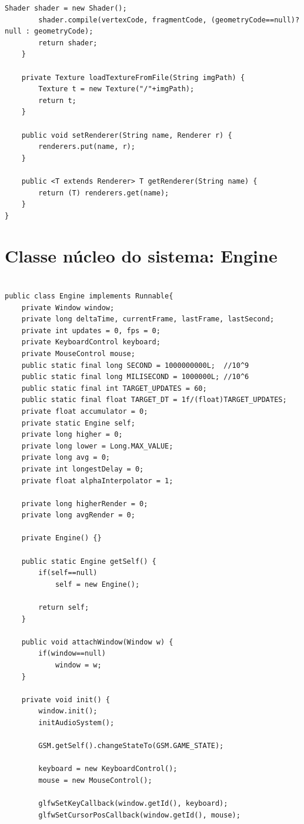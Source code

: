 \documentclass[12pt, 
openright, 
oneside, 
a4paper,    
brazil]{facom-ufu-abntex2}
\begin{document}
\begin{apendicesenv}
\begin{lstlisting}[caption=Classe Resource Manager]
        Shader shader = new Shader();
        shader.compile(vertexCode, fragmentCode, (geometryCode==null)? null : geometryCode);
        return shader;
    }
     
    private Texture loadTextureFromFile(String imgPath) {
        Texture t = new Texture("/"+imgPath); 
        return t;
    }
     
    public void setRenderer(String name, Renderer r) {
        renderers.put(name, r);
    }
     
    public <T extends Renderer> T getRenderer(String name) {
        return (T) renderers.get(name);
    }
}
\end{lstlisting}

\chapter{Classe núcleo do sistema: Engine }
\label{apend:alg:engine}

\begin{lstlisting}[caption=Classe Engine]

public class Engine implements Runnable{
	private Window window;
	private long deltaTime, currentFrame, lastFrame, lastSecond;
	private int updates = 0, fps = 0;
	private KeyboardControl keyboard;
	private MouseControl mouse;
	public static final long SECOND = 1000000000L;  //10^9
	public static final long MILISECOND = 1000000L; //10^6
	public static final int TARGET_UPDATES = 60;
	public static final float TARGET_DT = 1f/(float)TARGET_UPDATES; 
	private float accumulator = 0;
	private static Engine self;
	private long higher = 0;
	private long lower = Long.MAX_VALUE;
	private long avg = 0;
	private int longestDelay = 0;
	private float alphaInterpolator = 1;
	
	private long higherRender = 0;
	private long avgRender = 0;

	private Engine() {}
	
	public static Engine getSelf() {
		if(self==null) 
			self = new Engine();
		
		return self;
	}

	public void attachWindow(Window w) {
		if(window==null)
			window = w;
	}
	
	private void init() {
		window.init();
		initAudioSystem();
		
		GSM.getSelf().changeStateTo(GSM.GAME_STATE);
		
		keyboard = new KeyboardControl();
		mouse = new MouseControl();
		
		glfwSetKeyCallback(window.getId(), keyboard);
		glfwSetCursorPosCallback(window.getId(), mouse);
		

\end{lstlisting}
\end{apendicesenv}
\end{document}
